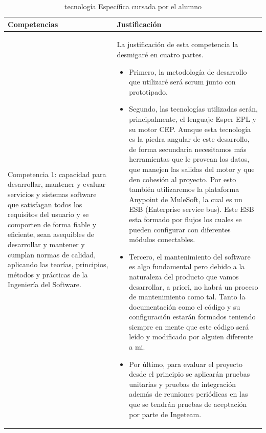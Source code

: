 \documentclass[a4paper]{article}
\begin{document}
\bigskip
\begin{longtable}{m{5.605cm}m{10.849cm}}
  	\caption{tecnolog\'ia Espec\'ifica cursada por el alumno}
  	\label{tab:tablaCompetencias}
  	\endfirsthead
  	\endhead

    \rowcolor{gray!50}
	{\color{black} \textbf{Competencias}} &
	{\color{black} \textbf{Justificaci\'on}}\\\hline
    
    {\color{black} Competencia 1: capacidad para desarrollar, mantener y evaluar servicios y sistemas software que satisfagan todos los requisitos del usuario y se comporten de forma fiable y eficiente, sean asequibles de desarrollar y mantener y cumplan normas de calidad, aplicando las teor\'ias, principios, m\'etodos y pr\'acticas de la Ingenier\'ia del Software.} &
    {\color{black} La justificación de esta competencia la desmigaré en cuatro partes.
    {\begin{itemize} 
    \item Primero, la metodología de desarrollo que utilizaré será scrum junto con prototipado.
    \item Segundo, las tecnologías utilizadas serán, principalmente, el lenguaje Esper EPL y su motor CEP. Aunque esta tecnología es la piedra angular de este desarrollo, de forma secundaria necesitamos más herramientas que le provean los datos, que manejen las salidas del motor y que den cohesión al proyecto. Por esto también utilizaremos la plataforma Anypoint de MuleSoft, la cual es un ESB (Enterprise service bus). Este ESB esta formado por flujos los cuales se pueden configurar con diferentes módulos conectables.
    \item Tercero, el mantenimiento del software es algo fundamental pero debido a la naturaleza del producto que vamos desarrollar, a priori, no habrá un proceso de mantenimiento como tal. Tanto la documentación como el código y su configuración estarán formados teniendo siempre en mente que este código será leído y modificado por alguien diferente a mi.
    \item Por último, para evaluar el proyecto desde el principio se aplicarán pruebas unitarias y pruebas de integración además de reuniones periódicas en las que se tendrán pruebas de aceptación por parte de Ingeteam.
    \end{itemize}}
    }\\
    

\end{longtable}
\end{document}
